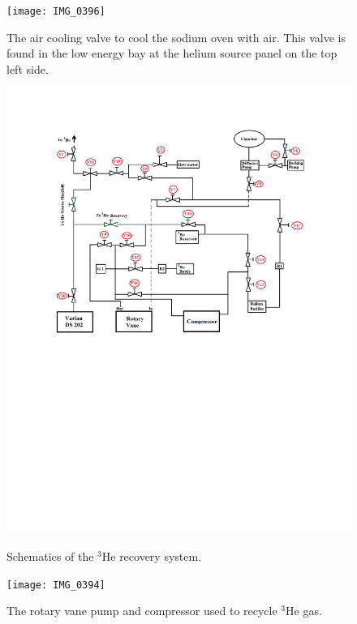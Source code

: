 \documentclass{article}
\begin{document}
\begin{figure}
\begin{center}
\texttt{[image: IMG\_0396]}\\
\end{center}
\caption{\label{figure19}The air cooling valve to cool the sodium oven with air. This valve is found in the low energy bay at the helium source panel on the top left side.}
\end{figure}

\begin{figure}
\begin{center}
\includegraphics[width=\textwidth]{He_Source_Valve_Diagram}\\
\vspace{-10cm}
\end{center}
\caption{\label{figure20}Schematics of the $^{3}$He recovery system.}
\end{figure}

\begin{figure}
\begin{center}
\texttt{[image: IMG\_0394]}\\
\end{center}
\caption{\label{figure21}The rotary vane pump and compressor used to recycle $^{3}$He gas.}
\end{figure}
\end{document}
